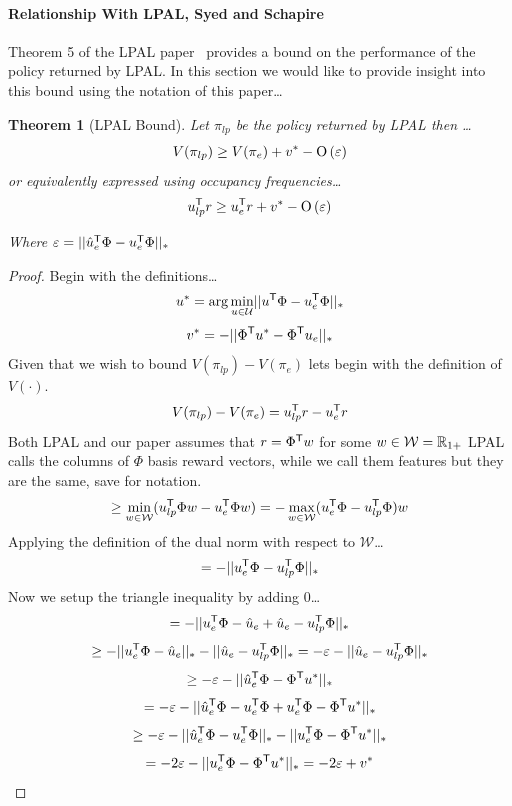 \documentclass[11pt]{article}
\newtheorem{theorem}{Theorem}
\begin{document}
\paragraph{Relationship With LPAL, Syed and Schapire~\cite{Syed2008}}

Theorem 5 of the LPAL paper~\cite{Syed2008} provides a bound on the performance of the policy returned by LPAL.
In this section we would like to provide insight into this bound using the notation of this paper\dots

\begin{theorem}[LPAL Bound]
	Let $\pi_{lp}$ be the policy returned by LPAL then \dots
	\[V(\pi_{lp}) \geq V(\pi_e) + v^* - \mbox{O}\left(\varepsilon\right)\]
	or equivalently expressed using occupancy frequencies\dots
	\[u_{lp}^{\mathsf{T}} r \geq u_e^{\mathsf{T}} r + v^* - \mbox{O}\left(\varepsilon\right)\]

	Where $\varepsilon = \lvert\lvert \hat{u}_e^{\mathsf{T}} \Phi - u_e^{\mathsf{T}} \Phi\rvert\rvert_*$
\end{theorem}

\begin{proof}
	Begin with the definitions\dots
	\[
		u^* = \arg\min_{u \in \mathcal{U}} \lvert\lvert u^{\mathsf{T}} \Phi - u_e^{\mathsf{T}} \Phi \rvert\rvert_*
	\]
	\[
		v^* = - \lvert\lvert \Phi^{\mathsf{T}} u^* - \Phi^{\mathsf{T}} u_e \rvert\rvert_*
	\]
	Given that we wish to bound $V(\pi_{lp}) - V(\pi_e)$ lets begin with the definition of $V(\cdot)$.
	\[V(\pi_{lp}) - V(\pi_e) = u_{lp}^{\mathsf{T}} r - u_e^{\mathsf{T}} r\]
	Both LPAL and our paper assumes that $r = \Phi^{\mathsf{T}} w$ for some $w \in \mathcal{W} = \mathbb{R}_{1+}$ LPAL calls the columns of $\Phi$ basis
	reward vectors, while we call them features but they are the same, save for notation.
	\[\geq \min_{w \in \mathcal{W}}(u_{lp}^{\mathsf{T}} \Phi w - u_e^{\mathsf{T}} \Phi w) =- \max_{w \in \mathcal{W}}(u_e^{\mathsf{T}} \Phi - u_{lp}^{\mathsf{T}} \Phi)w \]
	Applying the definition of the dual norm with respect to $\mathcal{W}$\dots
	\[= -\lvert\lvert u_e^{\mathsf{T}} \Phi - u_{lp}^{\mathsf{T}} \Phi \rvert\rvert_*\]
	Now we setup the triangle inequality by adding 0\dots
	\[= -\lvert\lvert u_e^{\mathsf{T}} \Phi - \hat{u}_e + \hat{u}_e - u_{lp}^{\mathsf{T}} \Phi \rvert\rvert_*\]
	\[\geq -\lvert\lvert u_e^{\mathsf{T}} \Phi - \hat{u}_e\rvert\rvert_* - \lvert\lvert \hat{u}_e - u_{lp}^{\mathsf{T}} \Phi \rvert\rvert_* = -\varepsilon - \lvert\lvert \hat{u}_e - u_{lp}^{\mathsf{T}} \Phi \rvert\rvert_* \]
	\[\geq -\varepsilon - \lvert\lvert \hat{u}_e^{\mathsf{T}} \Phi - \Phi^{\mathsf{T}} u^*\rvert\rvert_*\]
	\[= -\varepsilon - \lvert\lvert \hat{u}_e^{\mathsf{T}} \Phi - u_e^{\mathsf{T}}\Phi + u_e^{\mathsf{T}}\Phi - \Phi^{\mathsf{T}} u^*\rvert\rvert_*\]
	\[\geq -\varepsilon - \lvert\lvert \hat{u}_e^{\mathsf{T}} \Phi - u_e^{\mathsf{T}}\Phi\rvert\rvert_* - \lvert\lvert u_e^{\mathsf{T}}\Phi - \Phi^{\mathsf{T}} u^*\rvert\rvert_*\]
	\[= -2\varepsilon - \lvert\lvert u_e^{\mathsf{T}}\Phi - \Phi^{\mathsf{T}} u^*\rvert\rvert_* = -2\varepsilon + v^*\]
\end{proof}
\end{document}
